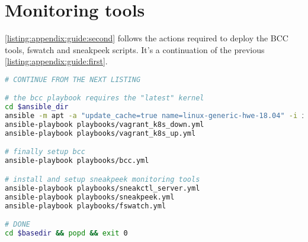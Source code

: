 \section{Monitoring tools}
\autoref{listing:appendix:guide:second} follows the actions required to deploy the BCC tools, fswatch and sneakpeek scripts. It's a continuation of the previous \autoref{listing:appendix:guide:first}.

\begin{lstlisting}[language=bash, style=custom, caption={Monitoring tools installation and setup including sneakpeek, fswatch, sneakctl\_server, bcc tools and kernel prerequisite.}, label=listing:appendix:guide:second]
# CONTINUE FROM THE NEXT LISTING

# the bcc playbook requires the "latest" kernel
cd $ansible_dir
ansible -m apt -a "update_cache=true name=linux-generic-hwe-18.04" -i inventory/prod/hosts k8s-cluster
ansible-playbook playbooks/vagrant_k8s_down.yml
ansible-playbook playbooks/vagrant_k8s_up.yml

# finally setup bcc
ansible-playbook playbooks/bcc.yml

# install and setup sneakpeek monitoring tools
ansible-playbook playbooks/sneakctl_server.yml
ansible-playbook playbooks/sneakpeek.yml
ansible-playbook playbooks/fswatch.yml

# DONE
cd $basedir && popd && exit 0
\end{lstlisting}
